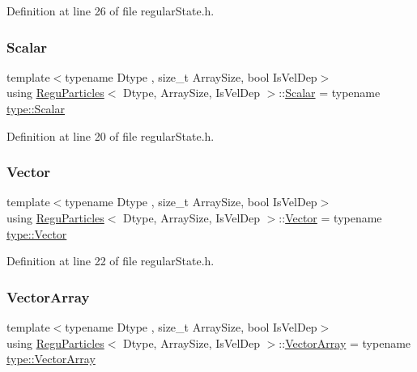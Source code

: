 Definition at line 26 of file regular\+State.\+h.

\mbox{\label{class_regu_particles_a91ab46dc1c711536776a28520485b5e4}} 
\subsubsection{\texorpdfstring{Scalar}{Scalar}}
{\footnotesize\ttfamily template$<$typename Dtype , size\+\_\+t Array\+Size, bool Is\+Vel\+Dep$>$ \\
using \mbox{\hyperlink{class_regu_particles}{Regu\+Particles}}$<$ Dtype, Array\+Size, Is\+Vel\+Dep $>$\+::\mbox{\hyperlink{class_vel_indep_particles_a5d275b22f0d759f360ddd80e78f4b466}{Scalar}} =  typename \mbox{\hyperlink{struct_space_h_1_1_proto_type_af3c8245d83d9db64749882920de5c274}{type\+::\+Scalar}}}



Definition at line 20 of file regular\+State.\+h.

\mbox{\label{class_regu_particles_a37d283e7ec44e971ddcbfe8897ef82ae}} 
\subsubsection{\texorpdfstring{Vector}{Vector}}
{\footnotesize\ttfamily template$<$typename Dtype , size\+\_\+t Array\+Size, bool Is\+Vel\+Dep$>$ \\
using \mbox{\hyperlink{class_regu_particles}{Regu\+Particles}}$<$ Dtype, Array\+Size, Is\+Vel\+Dep $>$\+::\mbox{\hyperlink{class_vel_indep_particles_aa7e03da81f44941c06abf43ec2180079}{Vector}} =  typename \mbox{\hyperlink{struct_space_h_1_1_proto_type_a316b81f4660b2b4fab14a8e1f23b6089}{type\+::\+Vector}}}



Definition at line 22 of file regular\+State.\+h.

\mbox{\label{class_regu_particles_a02f52b0d8ca1d8807b1745d0fecdf57b}} 
\subsubsection{\texorpdfstring{Vector\+Array}{VectorArray}}
{\footnotesize\ttfamily template$<$typename Dtype , size\+\_\+t Array\+Size, bool Is\+Vel\+Dep$>$ \\
using \mbox{\hyperlink{class_regu_particles}{Regu\+Particles}}$<$ Dtype, Array\+Size, Is\+Vel\+Dep $>$\+::\mbox{\hyperlink{class_vel_indep_particles_a27580f65b6523bfb6900520af2e44708}{Vector\+Array}} =  typename \mbox{\hyperlink{struct_space_h_1_1_proto_type_a622b8e122b33bb4966a02299fb7b82d6}{type\+::\+Vector\+Array}}}



